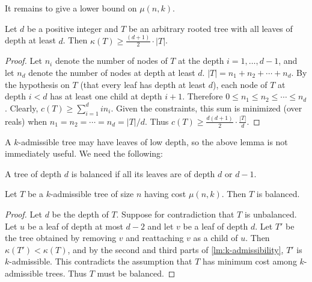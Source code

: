\documentclass[unicode,review]{siamart1116}
\numberwithin{theorem}{section}
\begin{document}
It remains to give a  lower bound on $\mu(n,k)$.  

\begin{lemma}
\label{lm:k-d-cost}
Let $d$ be a positive integer and $T$ be an arbitrary rooted tree with all leaves of depth at least $d$. Then 
$\kappa(T) \geq \frac{(d + 1)}{2} \cdot |T|$.
\end{lemma}
\begin{proof} %
Let $n_i$ denote the number of nodes of $T$ at the depth $i = 1, \dotsc, d - 1$, and let $n_d$ denote the number of  nodes at depth at least $d$. $|T|=n_1+n_2 + \dotsb + n_d$.  By the hypothesis on $T$ (that every leaf has depth at least $d$),
each node of $T$ at depth $i<d$ has at least one child at depth $i+1$.  Therefore $0\leq n_1 \leq n_2 \leq \dotsb \leq n_d$.
Clearly, $c(T) \geq \sum_{i=1}^d in_i$.
Given the constraints, this sum is minimized (over reals) when $n_1=n_2=\dotsb =n_d = |T| / d $. Thus $c(T) \geq \frac{d(d + 1)}{2} \cdot \frac{|T|}{d}$.
\end{proof}

A $k$-admissible tree may have leaves of low depth, so the above lemma is not immediately useful. We need
the following:

\begin{definition}
A tree of depth $d$ is balanced if all its leaves are of depth $d$ or $d - 1$.
\end{definition}


\begin{lemma}
\label{lm:balanced}
Let $T$ be a $k$-admissible tree of size $n$ having cost $\mu(n,k)$. Then $T$ is balanced.
\end{lemma}

\begin{proof}  %
Let $d$ be the depth of $T$.  Suppose for contradiction that $T$ is unbalanced.
Let $u$ be a leaf  of depth at most $d-2$ and let $v$ be a leaf of depth $d$.
Let $T'$ be the tree obtained by  
removing $v$ and reattaching $v$ as a child of  $u$. Then $\kappa(T') <\kappa(T)$, and  
by the second and third parts of \cref{lm:k-admissibility}, $T'$ is $k$-admissible. This  contradicts the assumption
that $T$ has minimum cost among $k$-admissible trees. 
Thus $T$ must be balanced.
\end{proof}
\end{document}
